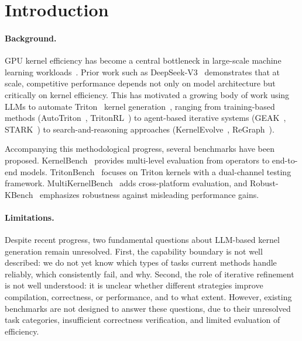 \section{Introduction}

\paragraph{Background.}
GPU kernel efficiency has become a central bottleneck in large-scale machine learning workloads~\cite{shah2024flashattention, zhang2025turbodiffusion, zhangefficient, zhangsageattention}. Prior work such as DeepSeek-V3~\cite{liu2024deepseek} demonstrates that at scale, competitive performance depends not only on model architecture but critically on kernel efficiency.
This has motivated a growing body of work using LLMs to automate Triton~\cite{tillet2019triton} kernel generation~\cite{yu2026towards}, ranging from training-based methods (AutoTriton~\cite{li2025autotriton}, TritonRL~\cite{woo2025tritonrl}) to agent-based iterative systems (GEAK~\cite{wang2025geak}, STARK~\cite{dong2025stark}) to search-and-reasoning approaches (KernelEvolve~\cite{liao2025kernelevolve}, ReGraph~\cite{gong2025large}).
\nocite{zhang2025spargeattn, zhang2025sla, zhang2026sla2, zhang2024sageattention2, zhang2025sageattention2++, zhang2025sageattention3, zhang2026sagebwd}

Accompanying this methodological progress, several benchmarks have been proposed. KernelBench~\cite{ouyang2025kernelbench} provides multi-level evaluation from operators to end-to-end models. TritonBench~\cite{li2025tritonbench} focuses on Triton kernels with a dual-channel testing framework. MultiKernelBench~\cite{wen2025multikernelbench} adds cross-platform evaluation, and Robust-KBench~\cite{lange2025towards} emphasizes robustness against misleading performance gains.

\paragraph{Limitations.}
Despite recent progress, two fundamental questions about LLM-based kernel generation remain unresolved.
First, the capability boundary is not well described: we do not yet know which types of tasks current methods handle reliably, which consistently fail, and why.
Second, the role of iterative refinement is not well understood: it is unclear whether different strategies improve compilation, correctness, or performance, and to what extent.
However, existing benchmarks are not designed to answer these questions, due to their unresolved task categories, insufficient correctness verification, and limited evaluation of efficiency.

